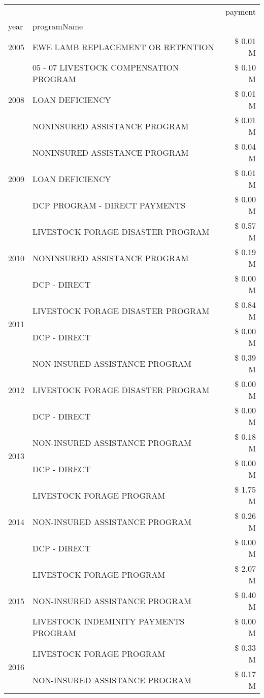 \begin{tabular}{llr}
\toprule
 &  & payment \\
year & programName &  \\
\midrule
2005 & EWE LAMB REPLACEMENT OR RETENTION & \$ 0.01 M \\
\cline{1-3}
\multirow[t]{3}{*}{2008} & 05 - 07 LIVESTOCK COMPENSATION PROGRAM & \$ 0.10 M \\
 & LOAN DEFICIENCY & \$ 0.01 M \\
 & NONINSURED ASSISTANCE PROGRAM & \$ 0.01 M \\
\cline{1-3}
\multirow[t]{3}{*}{2009} & NONINSURED ASSISTANCE PROGRAM & \$ 0.04 M \\
 & LOAN DEFICIENCY & \$ 0.01 M \\
 & DCP PROGRAM - DIRECT PAYMENTS & \$ 0.00 M \\
\cline{1-3}
\multirow[t]{3}{*}{2010} & LIVESTOCK FORAGE DISASTER PROGRAM & \$ 0.57 M \\
 & NONINSURED ASSISTANCE PROGRAM & \$ 0.19 M \\
 & DCP - DIRECT & \$ 0.00 M \\
\cline{1-3}
\multirow[t]{2}{*}{2011} & LIVESTOCK FORAGE DISASTER PROGRAM & \$ 0.84 M \\
 & DCP - DIRECT & \$ 0.00 M \\
\cline{1-3}
\multirow[t]{3}{*}{2012} & NON-INSURED ASSISTANCE PROGRAM & \$ 0.39 M \\
 & LIVESTOCK FORAGE DISASTER PROGRAM & \$ 0.00 M \\
 & DCP - DIRECT & \$ 0.00 M \\
\cline{1-3}
\multirow[t]{2}{*}{2013} & NON-INSURED ASSISTANCE PROGRAM & \$ 0.18 M \\
 & DCP - DIRECT & \$ 0.00 M \\
\cline{1-3}
\multirow[t]{3}{*}{2014} & LIVESTOCK FORAGE PROGRAM & \$ 1.75 M \\
 & NON-INSURED ASSISTANCE PROGRAM & \$ 0.26 M \\
 & DCP - DIRECT & \$ 0.00 M \\
\cline{1-3}
\multirow[t]{3}{*}{2015} & LIVESTOCK FORAGE PROGRAM & \$ 2.07 M \\
 & NON-INSURED ASSISTANCE PROGRAM & \$ 0.40 M \\
 & LIVESTOCK INDEMINITY PAYMENTS PROGRAM & \$ 0.00 M \\
\cline{1-3}
\multirow[t]{3}{*}{2016} & LIVESTOCK FORAGE PROGRAM & \$ 0.33 M \\
 & NON-INSURED ASSISTANCE PROGRAM & \$ 0.17 M \\

\end{tabular}
